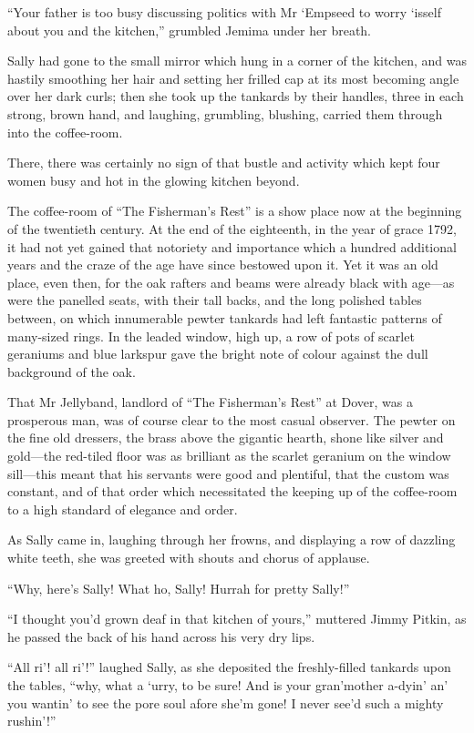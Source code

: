\enquote{Your father is too busy discussing politics with Mr `Empseed to worry `isself about you and the kitchen,} grumbled Jemima under her breath.

Sally had gone to the small mirror which hung in a corner of the kitchen, and was hastily smoothing her hair and setting her frilled cap at its most becoming angle over her dark curls; then she took up the tankards by their handles, three in each strong, brown hand, and laughing, grumbling, blushing, carried them through into the coffee-room.

There, there was certainly no sign of that bustle and activity which kept four women busy and hot in the glowing kitchen beyond.

The coffee-room of \enquote{The Fisherman's Rest} is a show place now at the beginning of the twentieth century. At the end of the eighteenth, in the year of grace 1792, it had not yet gained that notoriety and importance which a hundred additional years and the craze of the age have since bestowed upon it. Yet it was an old place, even then, for the oak rafters and beams were already black with age---as were the panelled seats, with their tall backs, and the long polished tables between, on which innumerable pewter tankards had left fantastic patterns of many-sized rings. In the leaded window, high up, a row of pots of scarlet geraniums and blue larkspur gave the bright note of colour against the dull background of the oak.

That Mr Jellyband, landlord of \enquote{The Fisherman's Rest} at Dover, was a prosperous man, was of course clear to the most casual observer. The pewter on the fine old dressers, the brass above the gigantic hearth, shone like silver and gold---the red-tiled floor was as brilliant as the scarlet geranium on the window sill---this meant that his servants were good and plentiful, that the custom was constant, and of that order which necessitated the keeping up of the coffee-room to a high standard of elegance and order.

As Sally came in, laughing through her frowns, and displaying a row of dazzling white teeth, she was greeted with shouts and chorus of applause.

\enquote{Why, here's Sally! What ho, Sally! Hurrah for pretty Sally!}

\enquote{I thought you'd grown deaf in that kitchen of yours,} muttered Jimmy Pitkin, as he passed the back of his hand across his very dry lips.

\enquote{All ri’! all ri’!} laughed Sally, as she deposited the freshly-filled tankards upon the tables, \enquote{why, what a `urry, to be sure! And is your gran'mother a-dyin’ an’ you wantin’ to see the pore soul afore she'm gone! I never see'd such a mighty rushin’!}

